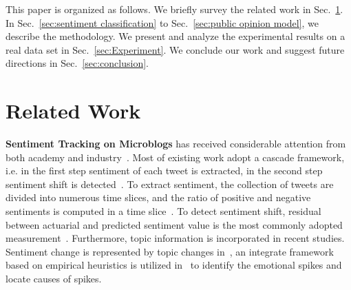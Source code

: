 \documentclass[runningheads]{llncs}
\begin{document}
This paper is organized as follows. We briefly survey the related work in Sec.~\ref{sec:related}. In Sec.~\ref{sec:sentiment classification} to Sec.~\ref{sec:public opinion model}, we describe the methodology. We present and analyze the experimental results on a real data set in Sec.~\ref{sec:Experiment}. We conclude our work and suggest future directions in Sec.~\ref{sec:conclusion}.


\section{Related Work}\label{sec:related}
\textbf{Sentiment Tracking on Microblogs} has received considerable attention from both academy and industry~\cite{Giachanou2016sentichange,Giachanou2017sentichange,Giachanou2016sentitime,An2014sentimentchange,Bollen2011sentimentchange,Tan2014topic,Montero2016sentimentchange}. Most of existing work adopt a cascade framework, i.e. in the first step sentiment of each tweet is extracted, in the second step sentiment shift is detected~\cite{Giachanou2016sentichange,Giachanou2017sentichange,Giachanou2016sentitime,An2014sentimentchange,Bollen2011sentimentchange,Tan2014topic}. To extract sentiment, the collection of tweets are divided into numerous time slices, and the ratio of positive and negative sentiments is computed in a time slice~\cite{Giachanou2017sentichange,Giachanou2016sentitime,An2014sentimentchange,Bollen2011sentimentchange}. 
To detect sentiment shift, residual between actuarial and predicted sentiment value is the most commonly adopted measurement~\cite{Giachanou2016sentichange,Giachanou2016sentitime}. 
Furthermore, topic information is incorporated in recent studies. Sentiment change is represented by topic changes in~\cite{Tan2014topic}, an integrate framework based on empirical heuristics is utilized in~\cite{Montero2016sentimentchange} to identify
the emotional spikes and locate causes of spikes.%
\end{document}
